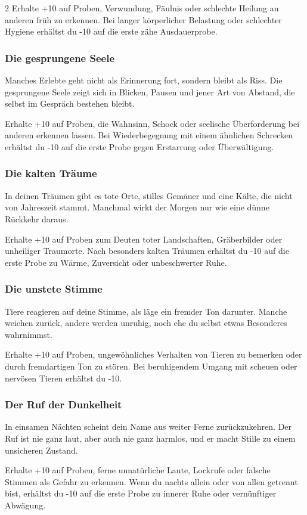 {\begin{multicols*}{2}
        \malspielwertebox
        {Erhalte +10 auf Proben, Verwundung, Fäulnis oder schlechte Heilung an anderen früh zu erkennen.}
        {Bei langer körperlicher Belastung oder schlechter Hygiene erhältst du -10 auf die erste zähe Ausdauerprobe.}

        \subsubsection*{Die gesprungene Seele}
        Manches Erlebte geht nicht als Erinnerung fort, sondern bleibt als Riss. Die gesprungene Seele zeigt sich in Blicken, Pausen und jener Art von Abstand, die selbst im Gespräch bestehen bleibt.

        \malspielwertebox
        {Erhalte +10 auf Proben, die Wahnsinn, Schock oder seelische Überforderung bei anderen erkennen lassen.}
        {Bei Wiederbegegnung mit einem ähnlichen Schrecken erhältst du -10 auf die erste Probe gegen Erstarrung oder Überwältigung.}

        \subsubsection*{Die kalten Träume}
        In deinen Träumen gibt es tote Orte, stilles Gemäuer und eine Kälte, die nicht von Jahreszeit stammt. Manchmal wirkt der Morgen nur wie eine dünne Rückkehr daraus.

        \malspielwertebox
        {Erhalte +10 auf Proben zum Deuten toter Landschaften, Gräberbilder oder unheiliger Traumorte.}
        {Nach besonders kalten Träumen erhältst du -10 auf die erste Probe zu Wärme, Zuversicht oder unbeschwerter Ruhe.}

        \subsubsection*{Die unstete Stimme}
        Tiere reagieren auf deine Stimme, als läge ein fremder Ton darunter. Manche weichen zurück, andere werden unruhig, noch ehe du selbst etwas Besonderes wahrnimmst.

        \malspielwertebox
        {Erhalte +10 auf Proben, ungewöhnliches Verhalten von Tieren zu bemerken oder durch fremdartigen Ton zu stören.}
        {Bei beruhigendem Umgang mit scheuen oder nervösen Tieren erhältst du -10.}

        \subsubsection*{Der Ruf der Dunkelheit}
        In einsamen Nächten scheint dein Name aus weiter Ferne zurückzukehren. Der Ruf ist nie ganz laut, aber auch nie ganz harmlos, und er macht Stille zu einem unsicheren Zustand.

        \malspielwertebox
        {Erhalte +10 auf Proben, ferne unnatürliche Laute, Lockrufe oder falsche Stimmen als Gefahr zu erkennen.}
        {Wenn du nachts allein oder von allen getrennt bist, erhältst du -10 auf die erste Probe zu innerer Ruhe oder vernünftiger Abwägung.}

    \end{multicols*}
}
